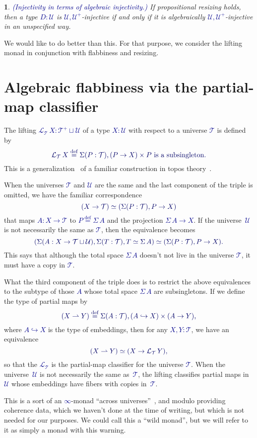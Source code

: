 \documentclass[10pt]{article}
\newcommand{\db}{\textcolor{darkblue}}
\newcommand{\emb}{\hookrightarrow}
\newcommand{\partialto}{\rightharpoonup}
\newcommand{\df}[1]{\emph{\db{#1}}}
\newcommand{\m}[1]{\db{$#1$}}
\newcommand{\M}[1]{\[\db{#1}\]}
\newcommand{\U}{\mathcal{U}}
\newcommand{\T}{\mathcal{T}}
\newcommand{\Lift}{\mathcal{L}}
\newcommand{\eqdef}{\overset{\text{def}}{=}}
\newtheorem{numbered}{}
\theoremstyle{definition}
\begin{document}
\begin{numbered} \label{worse} \df{(Injectivity in terms of algebraic injectivity.)}
  If propositional resizing holds, then a type \m{D : \U} is \m{\U,\U^+}-injective if and only if it is algebraically \m{\U,\U^+}-injective in an unspecified way.
\end{numbered}
\noindent We would like to do better than this. For that purpose, we consider
the lifting monad in conjunction with flabbiness and resizing.

\section{Algebraic flabbiness via the partial-map classifier}

The lifting \m{\Lift_{\T} \, X : \T^+ \sqcup \U} of a type \m{X:\U}
with respect to a universe \m{\T} %
is defined by
%
\M{ \Lift_{\T}\, X \eqdef \Sigma (P : \T), (P \to X) \times
  \text{\m{P} is a subsingleton}.  }
%
This is a generalization~\cite{MR3695545} of a familiar construction
in topos theory~\cite{MR1173017}.

When the universes \m{\T} and \m{\U} are the same and the last
component of the triple is omitted, we have the familiar
correspondence
%
\M{
  (X \to \T) \simeq (\Sigma (P : \T), P \to X)
}
%
that maps \m{A : X \to \T} to \m{P \eqdef \Sigma \, A} and the
projection \m{\Sigma \, A \to X}.  If the universe~\m{\U} is not
necessarily the same as \m{\T}, then the equivalence becomes
%
\M{
  (\Sigma (A : X \to \T \sqcup \U), \Sigma(T : \T), T \simeq \Sigma \, A) \simeq (\Sigma (P : \T), P \to X).
}
%
This says that although the total space \m{\Sigma \, A} doesn't not
live in the universe \m{\T}, it must have a copy in \m{\T}.

What the third component of the triple does is to restrict the above
equivalences to the subtype of those \m{A} whose total space \m{\Sigma
  \, A} are subsingletons. If we define the type of partial maps by
%
\M{(X \partialto Y) \eqdef \Sigma (A : \T), (A \emb X) \times (A \to Y),
}
%
where \m{A \emb X} is the type of embeddings, then for any \m{X,Y :
  \T}, we have an equivalence
%
\M{
  (X \partialto Y)
  \simeq (X \to \Lift_{\T} \, Y),
}
%
so that the \m{\Lift_{\T}} is the partial-map classifier for the universe
\m{\T}.  When the universe~\m{\U} is not necessarily the same
as~\m{\T}, the lifting classifies partial maps in~\m{\U} whose
embeddings have fibers with copies in~\m{\T}.

This is a sort of an \m{\infty}-monad ``across
universes''~\cite{TypeTopology}, and modulo providing coherence data,
which we haven't done at the time of writing, but which is not needed
for our purposes. We could call this a ``wild monad'', but we will
refer to it as simply a monad with this warning.
\end{document}
